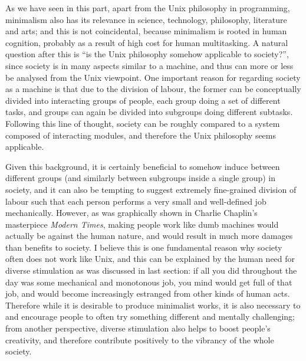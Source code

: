 As we have seen in this part, apart from the Unix philosophy in programming,
minimalism also has its relevance in science, technology, philosophy,
literature and arts; and this is not coincidental, because minimalism is rooted
in human cognition, probably as a result of high cost for human multitasking.
A natural question after this is ``is the Unix philosophy somehow applicable
to society?'', since society is in many aspects similar to a machine, and thus
can more or less be analysed from the Unix viewpoint.  One important reason
for regarding society as a machine is that due to the division of labour,
the former can be conceptually divided into interacting groups of people,
each group doing a set of different tasks, and groups can again be divided
into subgroups doing different subtasks.  Following this line of thought,
society can be roughly compared to a system composed of interacting
modules, and therefore the Unix philosophy seems applicable.

Given this background, it is certainly beneficial to somehow induce
 between different groups
(and similarly between subgroups inside a single group) in society, and it can
also be tempting to suggest extremely fine-grained division of labour such that
each person performs a very small and well-defined job mechanically.  However,
as was graphically shown in Charlie Chaplin's masterpiece \emph{Modern Times},
making people work like dumb machines would actually be against the human
nature, and would result in much more damages than benefits to society.
I believe this is one fundamental reason why society often does not work like
Unix, and this can be explained by the human need for diverse stimulation as was
discussed in last section: if all you did throughout the day was some mechanical
and monotonous job, you mind would get full of that job, and would become
increasingly estranged from other kinds of human acts.  Therefore while it is
desirable to produce minimalist works, it is also necessary to  and encourage people to often try something different and
mentally challenging; from another perspective, diverse stimulation also
helps to boost people's creativity, and therefore contribute
positively to the vibrancy of the whole society.

